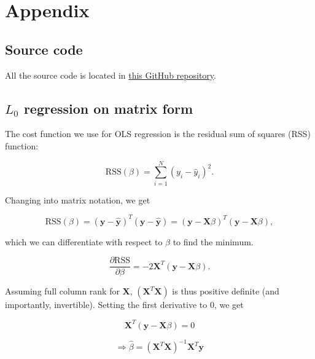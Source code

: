 \documentclass[../main.tex]{subfiles}
\begin{document}
\section{Appendix}
\subsection{Source code}
All the source code is located in \href{https://github.com/kmaasrud/reg-resample-fys-stk4155}{this GitHub repository}.

\subsection{$L_0$ regression on matrix form}
\label{sec:L0_matrix_form}
The cost function we use for OLS regression is the residual sum of squares (RSS) function:

\begin{equation*}
  \text{RSS}(\beta) = \sum_{i=1}^N \left(y_i - \hat y_i\right)^2 .
\end{equation*}

Changing into matrix notation, we get

\begin{equation*}
  \text{RSS}(\beta) = (\mathbf y - \hat{\mathbf y})^T(\mathbf y - \hat{\mathbf y}) = (\mathbf y  - \mathbf X\beta)^T(\mathbf y - \mathbf X\beta) ,
\end{equation*}

which we can differentiate with respect to $\beta$ to find the minimum.

\begin{equation*}
  \frac{\partial \text{RSS}}{\partial \beta} = -2\mathbf X^T (\mathbf y - \mathbf X\beta) .
\end{equation*}

Assuming full column rank for $\mathbf X$, $(\mathbf X^T \mathbf X)$ is thus positive definite (and importantly, invertible). Setting the first derivative to $0$, we get

\begin{equation*}
  \mathbf X^T(\mathbf y - \mathbf X\beta) = 0
\end{equation*}

\begin{equation*}
  \Rightarrow \hat \beta = (\mathbf X^T\mathbf X)^{-1}\mathbf X^T \mathbf y
\end{equation*}
\end{document}
